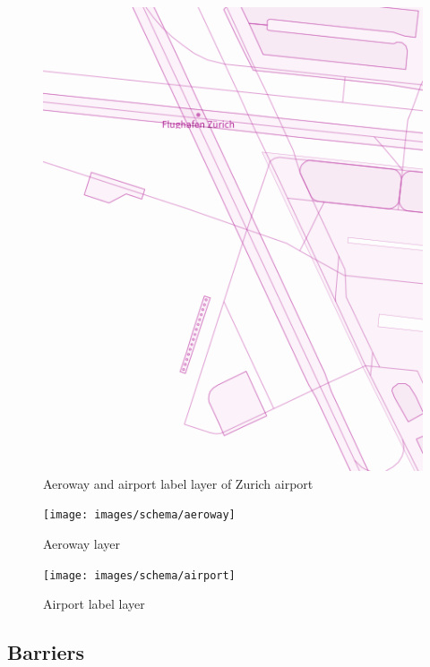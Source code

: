 \begin{minipage}[t]{0.48\linewidth}
    \vspace{-20pt}
    \begin{figure}[H]
      \centering
      \includegraphics[width=1\textwidth]{images/schema/aeroway_example}
      \caption{Aeroway and airport label layer of Zurich airport}
    \end{figure}
\end{minipage}

\begin{figure}[H]
  \centering
  \texttt{[image: images/schema/aeroway]}
  \caption{Aeroway layer}
\end{figure}

\begin{figure}[H]
  \centering
  \texttt{[image: images/schema/airport]}
  \caption{Airport label layer}
\end{figure}

\subsection{Barriers}

